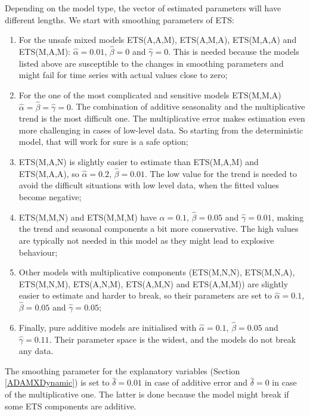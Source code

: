 \documentclass[
]{book}
\providecommand{\tightlist}{%
  \setlength{\itemsep}{0pt}\setlength{\parskip}{0pt}}
\theoremstyle{definition}
\theoremstyle{definition}
\theoremstyle{definition}
\theoremstyle{definition}
\theoremstyle{remark}
\begin{document}
Depending on the model type, the vector of estimated parameters will have different lengths. We start with smoothing parameters of ETS:

\begin{enumerate}
\def\labelenumi{\arabic{enumi}.}
\tightlist
\item
  For the unsafe mixed models ETS(A,A,M), ETS(A,M,A), ETS(M,A,A) and ETS(M,A,M): \(\hat{\alpha}=0.01\), \(\hat{\beta}=0\) and \(\hat{\gamma}=0\). This is needed because the models listed above are susceptible to the changes in smoothing parameters and might fail for time series with actual values close to zero;
\item
  For the one of the most complicated and sensitive models ETS(M,M,A) \(\hat{\alpha}=\hat{\beta}=\hat{\gamma}=0\). The combination of additive seasonality and the multiplicative trend is the most difficult one. The multiplicative error makes estimation even more challenging in cases of low-level data. So starting from the deterministic model, that will work for sure is a safe option;
\item
  ETS(M,A,N) is slightly easier to estimate than ETS(M,A,M) and ETS(M,A,A), so \(\hat{\alpha}=0.2\), \(\hat{\beta}=0.01\). The low value for the trend is needed to avoid the difficult situations with low level data, when the fitted values become negative;
\item
  ETS(M,M,N) and ETS(M,M,M) have \(\hat{\alpha}=0.1\), \(\hat{\beta}=0.05\) and \(\hat{\gamma}=0.01\), making the trend and seasonal components a bit more conservative. The high values are typically not needed in this model as they might lead to explosive behaviour;
\item
  Other models with multiplicative components (ETS(M,N,N), ETS(M,N,A), ETS(M,N,M), ETS(A,N,M), ETS(A,M,N) and ETS(A,M,M)) are slightly easier to estimate and harder to break, so their parameters are set to \(\hat{\alpha}=0.1\), \(\hat{\beta}=0.05\) and \(\hat{\gamma}=0.05\);
\item
  Finally, pure additive models are initialised with \(\hat{\alpha}=0.1\), \(\hat{\beta}=0.05\) and \(\hat{\gamma}=0.11\). Their parameter space is the widest, and the models do not break any data.
\end{enumerate}

The smoothing parameter for the explanatory variables (Section \ref{ADAMXDynamic}) is set to \(\hat{\delta}=0.01\) in case of additive error and \(\hat{\delta}=0\) in case of the multiplicative one. The latter is done because the model might break if some ETS components are additive.
\end{document}
